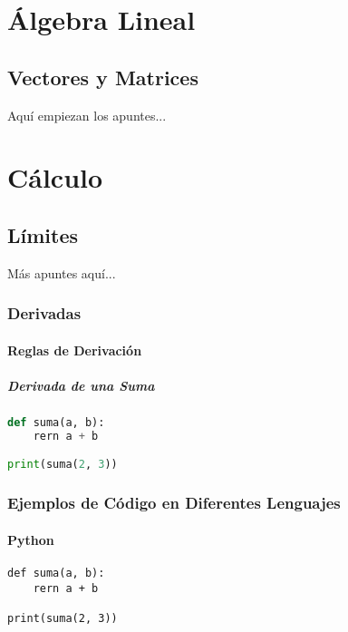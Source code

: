 \documentclass[12pt,a4paper]{report}
\begin{document}

\thispagestyle{empty} %
\clearpage

\tableofcontents
\thispagestyle{empty} %
\clearpage

\part{Álgebra Lineal}
\chapter{Vectores y Matrices}
Aquí empiezan los apuntes...

\part{Cálculo}
\chapter{Límites}
Más apuntes aquí...

\section{Derivadas}
\subsection{Reglas de Derivación}
\subsubsection{Derivada de una Suma}

\begin{lstlisting}[language=Python, caption={Ejemplo de código Python}]
def suma(a, b):
    rern a + b

print(suma(2, 3))
\end{lstlisting}

\section{Ejemplos de Código en Diferentes Lenguajes}

\subsection{Python}
\begin{lstlisting}[style=style1, caption={Ejemplo de código Python}]
def suma(a, b):
    rern a + b

print(suma(2, 3))
\end{lstlisting}
\end{document}
